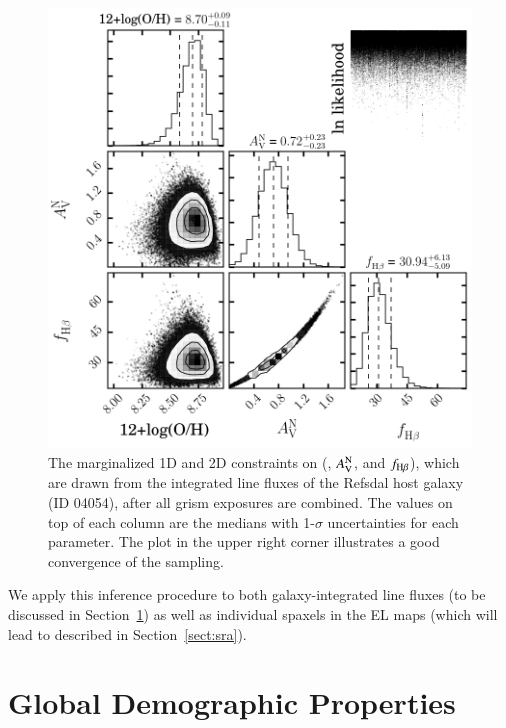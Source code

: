 \begin{figure}
    \centering
    \includegraphics[width=\textwidth]{fig/corner_id04054.png}
    \caption[Marginalized 1D and 2D constraints from our Bayesian parameter inference.]{The marginalized 1D and 2D constraints on (\oh, $A_{\mathrm V}^{\mathrm N}$, and
    $f_{\textrm{H}\beta}$), which are drawn from the integrated line fluxes of the Refsdal host
    galaxy (ID 04054), after all grism exposures are combined. The values on top of each
    column are the medians with 1-$\sigma$ uncertainties for each parameter. The plot in the
    upper right corner illustrates a good convergence of the sampling.}
    \label{fig:corner}
\end{figure}



We apply this inference procedure to both galaxy-integrated line
fluxes (to be discussed in Section~\ref{sect:global}) as well as
individual spaxels in the EL maps (which will lead to \mgms described
in Section~\ref{sect:sra}).

\section{Global Demographic Properties}\label{sect:global}

